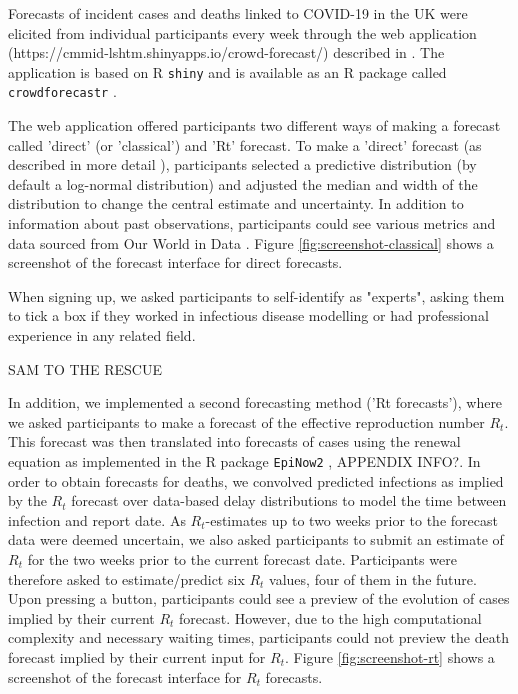 \documentclass[10pt,a4paper,twocolumn]{article}
\begin{document}
Forecasts of incident cases and deaths linked to COVID-19 in the UK were elicited from individual participants every week through the web application (https://cmmid-lshtm.shinyapps.io/crowd-forecast/) described in \cite{bosseComparingHumanModelbased2022}. The application is based on \textsf{R} \cite{R} \texttt{shiny} \cite{shiny} and is available as an \textsf{R} package called \texttt{crowdforecastr} \citep{crowdforecastr}. 

The web application offered participants two different ways of making a forecast called 'direct' (or 'classical') and 'Rt' forecast. To make a 'direct' forecast (as described in more detail \cite{bosseComparingHumanModelbased2022}), participants selected a predictive distribution (by default a log-normal distribution) and adjusted the median and width of the distribution to change the central estimate and uncertainty. In addition to information about past observations, participants could see various metrics and data sourced from Our World in Data \citep{owidcoronavirus}. Figure \ref{fig:screenshot-classical} shows a screenshot of the forecast interface for direct forecasts. 

When signing up, we asked participants to self-identify as "experts", asking them to tick a box if they worked in infectious disease modelling or had professional experience in any related field. 

SAM TO THE RESCUE

In addition, we implemented a second forecasting method ('Rt forecasts'), where we asked participants to make a forecast of the effective reproduction number $R_t$. This forecast was then translated into forecasts of cases using the renewal equation \citep{fraserEstimatingIndividualHousehold2007} as implemented in the \textsf{R} package \texttt{EpiNow2} \citep{epinow2}, APPENDIX INFO?. In order to obtain forecasts for deaths, we convolved predicted infections as implied by the $R_t$ forecast over data-based delay distributions \cite{epinow2, sherrattExploringSurveillanceData2021, abbottEstimatingTimevaryingReproduction2020a} to model the time between infection and report date. As $R_t$-estimates up to two weeks prior to the forecast data were deemed uncertain, we also asked participants to submit an estimate of $R_t$ for the two weeks prior to the current forecast date. Participants were therefore asked to estimate/predict six $R_t$ values, four of them in the future. Upon pressing a button, participants could see a preview of the evolution of cases implied by their current $R_t$ forecast. However, due to the high computational complexity and necessary waiting times, participants could not preview the death forecast implied by their current input for $R_t$. Figure \ref{fig:screenshot-rt} shows a screenshot of the forecast interface for $R_t$ forecasts. 
\end{document}
